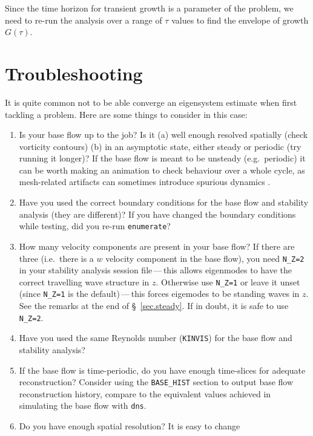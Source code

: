 \documentclass[11pt,a4paper]{report}
\newcommand{\eg}{e.g.\ }
\begin{document}
Since the time horizon for transient growth is a parameter of the
problem, we need to re-run the analysis over a range of $\tau$ values
to find the envelope of growth $G(\tau)$.

\chapter{Troubleshooting}
\label{sec.trouble}

It is quite common not to be able converge an eigensystem estimate
when first tackling a problem.  Here are some things to consider in
this case:

\begin{enumerate}
\item
Is your base flow up to the job?  Is it (a) well enough resolved
spatially (check vorticity contours) (b) in an asymptotic state,
either steady or periodic (try running it longer)? If the base flow is
meant to be unsteady (\eg periodic) it can be worth making an
animation to check behaviour over a whole cycle, as mesh-related
artifacts can sometimes introduce spurious dynamics \citep[see \eg
  \S\,4.1 of][]{bbs08b}.
\item
Have you used the correct boundary conditions for the base flow and
stability analysis (they are different)?  If you have changed the
boundary conditions while testing, did you re-run \texttt{enumerate}?
\item
How many velocity components are present in your base flow?  If there
are three (i.e.\ there is a $w$ velocity component in the base flow),
you need \verb+N_Z=2+ in your stability analysis session
file\,---\,this allows eigenmodes to have the correct travelling wave
structure in $z$.  Otherwise use \verb+N_Z=1+ or leave it unset (since
\verb+N_Z=1+ is the default)\,---\,this forces eigemodes to be
standing waves in $z$. See the remarks at the end of
\S~\ref{sec.steady}.  If in doubt, it is safe to use \verb+N_Z=2+.
\item
Have you used the same Reynolds number (\verb+KINVIS+) for the base
flow and stability analysis?
\item
If the base flow is time-periodic, do you have enough time-slices for
adequate reconstruction?  Consider using the \verb+BASE_HIST+ section
to output base flow reconstruction history, compare to the equivalent
values achieved in simulating the base flow with \verb+dns+.
\item
Do you have enough spatial resolution? It is easy to change

\end{enumerate}
\end{document}
